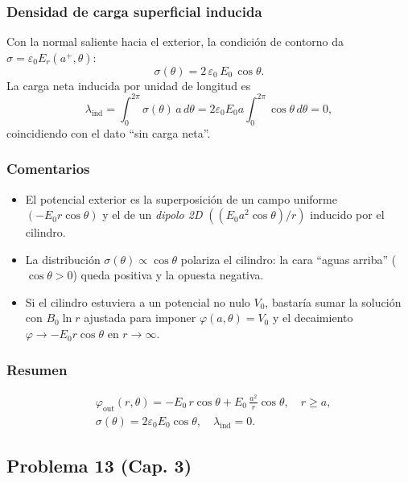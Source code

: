 \documentclass{article}
\begin{document}
\subsubsection*{Densidad de carga superficial inducida}
Con la normal saliente hacia el exterior, la condición de contorno da $\sigma=\varepsilon_0 E_r(a^{+},\theta)$:
\[
\boxed{\ \sigma(\theta)=2\,\varepsilon_0\,E_0\,\cos\theta.\ }
\]
La carga neta inducida por unidad de longitud es
\[
\lambda_{\text{ind}}=\int_{0}^{2\pi}\sigma(\theta)\,a\,d\theta
=2\varepsilon_0 E_0 a\int_{0}^{2\pi}\cos\theta\,d\theta=0,
\]
coincidiendo con el dato “sin carga neta”.

\subsubsection*{Comentarios}
\begin{itemize}
\item El potencial exterior es la superposición de un campo uniforme $(-E_0 r\cos\theta)$ y el de un \emph{dipolo 2D} $((E_0 a^{2}\cos\theta)/r)$ inducido por el cilindro.
\item La distribución $\sigma(\theta)\propto\cos\theta$ polariza el cilindro: la cara “aguas arriba” ($\cos\theta>0$) queda positiva y la opuesta negativa.
\item Si el cilindro estuviera a un potencial no nulo $V_0$, bastaría sumar la solución con $B_0\ln r$ ajustada para imponer $\varphi(a,\theta)=V_0$ y el decaimiento $\varphi\to -E_0 r\cos\theta$ en $r\to\infty$.
\end{itemize}

\subsubsection*{Resumen}
\[
\boxed{
\begin{aligned}
&\varphi_{\text{out}}(r,\theta)=-E_0\,r\cos\theta+E_0\,\frac{a^{2}}{r}\cos\theta,\quad r\ge a,\\[4pt]
&\sigma(\theta)=2\varepsilon_0 E_0\cos\theta,\quad \lambda_{\text{ind}}=0.
\end{aligned}}
\]


\subsection{Problema 13 (Cap. 3)} \vspace{0.5cm}
\end{document}

